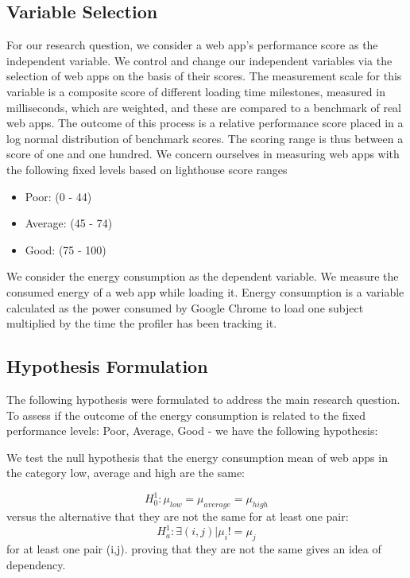 \subsection{Variable Selection}

For our research question, we consider a web app's performance score as the independent variable. We control and change our independent variables via the selection of web apps on the basis of their scores. The measurement scale for this variable is a composite score of different loading time milestones, measured in milliseconds, which are weighted, and these are compared to a benchmark of real web apps. The outcome of this process is a relative performance score placed in a log normal distribution of benchmark scores. 
The scoring range is thus between a score of one and one hundred. We concern ourselves in measuring web apps with the following fixed levels based on lighthouse score ranges \cite{WEBSITE:13}

\begin{itemize}
\item Poor: (0 - 44)
\item Average: (45 - 74)
\item Good: (75 - 100)
\newline
\end{itemize}

We consider the energy consumption as the dependent variable. We measure the consumed energy of a web app while loading it. Energy consumption is a variable calculated as the power consumed by Google Chrome to load one subject multiplied by the time the profiler has been tracking it.
\newline


\subsection{Hypothesis Formulation}
The following hypothesis were formulated to address the main research question.
To assess if the outcome of the energy consumption is related to the fixed performance levels: Poor, Average, Good - we have the following hypothesis: \newline

We test the null hypothesis that the energy consumption mean of web apps in the category low, average and high are the same: 

\[ H_0^1: \mu_{low} = \mu_{average} = \mu_{high} \]
versus the alternative that they are not the same for at least one pair: \[ H_{a}^1: \exists (i,j) | \mu_{i} != \mu_{j} \] for at least one pair (i,j). proving that they are not the same gives an idea of dependency.

